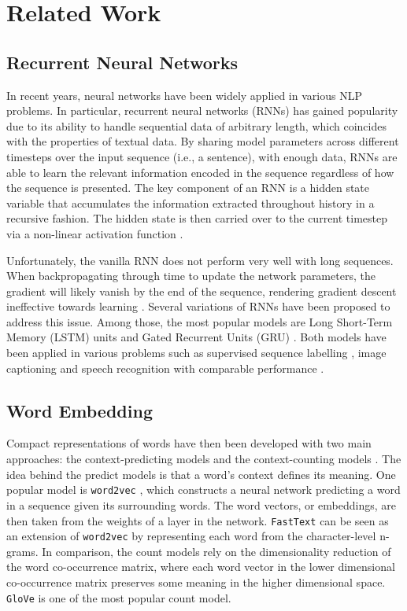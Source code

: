 \section{Related Work}
\label{sec: related_work}
\subsection{Recurrent Neural Networks}
In recent years, neural networks have been widely applied in various NLP problems. In particular, recurrent neural networks (RNNs) has gained popularity due to its ability to handle sequential data of arbitrary length, which coincides with the properties of textual data. By sharing model parameters across different timesteps over the input sequence (i.e., a sentence), with enough data, RNNs are able to learn the relevant information encoded in the sequence regardless of how the sequence is presented. The key component of an RNN is a hidden state variable that accumulates the information extracted throughout history in a recursive fashion. The hidden state is then carried over to the current timestep via a non-linear activation function \cite{goodfellow2016}.

Unfortunately, the vanilla RNN does not perform very well with long sequences. When backpropagating through time to update the network parameters, the gradient will likely vanish by the end of the sequence, rendering gradient descent ineffective towards learning \cite{goodfellow2016}. Several variations of RNNs have been proposed to address this issue. Among those, the most popular models are Long Short-Term Memory (LSTM) units \cite{hochreiter1997long} and Gated Recurrent Units (GRU) \cite{cho2014properties}. Both models have been applied in various problems such as supervised sequence labelling \cite{graves2012supervised}, image captioning \cite{vinyals_2015} and speech recognition \cite{graves2013speech} with comparable performance \cite{yin2017comparative}.

\subsection{Word Embedding}
Compact representations of words have then been developed with two main approaches: the context-predicting models and the context-counting models \cite{baroni2014don}. The idea behind the predict models is that a word's context defines its meaning. One popular model is \texttt{word2vec} \cite{mikolov2013efficient}, which constructs a neural network predicting a word in a sequence given its surrounding words. The word vectors, or embeddings, are then taken from the weights of a layer in the network. \texttt{FastText} \cite{bojanowski2017enriching} can be seen as an extension of \texttt{word2vec} by representing each word from the character-level n-grams. In comparison, the count models rely on the dimensionality reduction of the word co-occurrence matrix, where each word vector in the lower dimensional co-occurrence matrix preserves some meaning in the higher dimensional space. \texttt{GloVe} \cite{pennington2014glove} is one of the most popular count model. 

